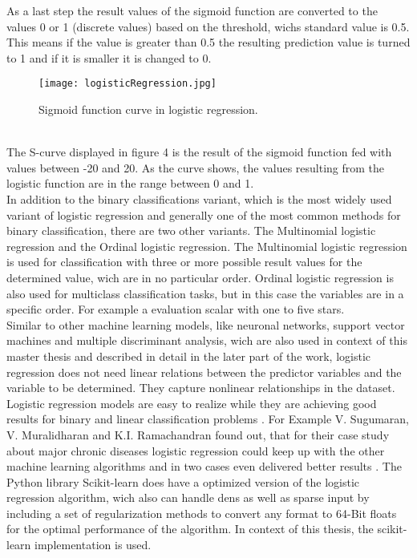 \documentclass[../masterarbeit.tex]{subfiles}
\begin{document}
As a last step the result values of the sigmoid function are converted to the values 0 or 1 (discrete values) based on the threshold, wichs standard value is 0.5. This means if the value is greater than 0.5 the resulting prediction value is turned to 1 and if it is smaller it is changed to 0. \autocite[]{Sourav:2020} \textcite[]{BELYADI2021169}
\begin{figure}[h]
    \centering
    \texttt{[image: logisticRegression.jpg]}
    \caption{Sigmoid function curve in logistic regression.}
\end{figure} \\
The S-curve displayed in figure 4 is the result of the sigmoid function fed with values between -20 and 20. As the curve shows, the values resulting from the logistic function are in the range between 0 and 1.\\
In addition to the binary classifications variant, which is the most widely used variant of logistic regression and generally one of the most common methods for binary classification, there are two other variants. The Multinomial logistic regression and the Ordinal logistic regression. The Multinomial logistic regression is used for classification with three or more possible result values for the determined value, wich are in no particular order. Ordinal logistic regression is also used for multiclass classification tasks, but in this case the variables are in a specific order. For example a evaluation scalar with one to five stars. \autocite[]{ibm-logistic-regression:2022} \textcite[]{SUBASI202091} \\
Similar to other machine learning models, like neuronal networks, support vector machines and multiple discriminant analysis, wich are also used in context of this master thesis and described in detail in the later part of the work, logistic regression does not need linear relations between the predictor variables and the variable to be determined. They capture nonlinear relationships in the dataset. \autocite[]{NUSINOVICI202056} \textcite[]{BELYADI2021169} \\
Logistic regression models are easy to realize while they are achieving good results for binary and linear classification problems \textcite[]{SUBASI202091}. For Example V. Sugumaran, V. Muralidharan and K.I. Ramachandran found out, that for their case study about major chronic diseases logistic regression could keep up with the other machine learning algorithms and in two cases even delivered better results \textcite[]{NUSINOVICI202056}.
The Python library Scikit-learn does have a optimized version of the logistic regression algorithm, wich also can handle dens as well as sparse input by including a set of regularization methods to convert any format to 64-Bit floats for the optimal performance of the algorithm\textcite[]{Scikit-learn-logistic-regression:2022}. In context of this thesis, the scikit-learn implementation is used.
\end{document}
